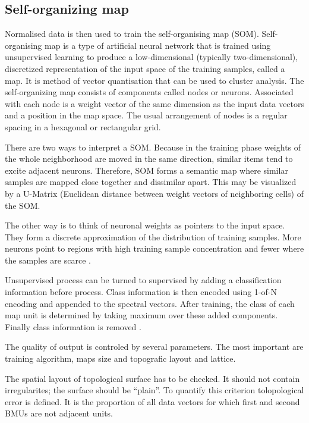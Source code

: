 \documentclass[a4paper]{IEEEtran}
\begin{document}
\subsection{Self-organizing map}
Normalised data is then used to train the self-organising map (SOM).
Self-organising map is a type of artificial neural network that is
trained using unsupervised learning to produce a low-dimensional 
(typically two-dimensional), discretized representation of the input 
space of the training samples, called a map. It is method of vector 
quantisation that can be used to 
cluster analysis.
The self-organizing map consists of components called nodes or neurons. 
Associated with each node is a weight vector of the same dimension 
as the input data vectors and a position in the map space. 
The usual arrangement of nodes is a regular spacing in a hexagonal or rectangular grid. 

There are two ways to interpret a SOM. 
Because in the training phase weights of the whole neighborhood are moved in the 
same direction, similar items tend to excite adjacent neurons. Therefore, 
SOM forms a semantic map where similar samples are mapped close together 
and dissimilar apart. This may be visualized by a U-Matrix 
(Euclidean distance between weight vectors of neighboring cells) of the SOM.

The other way is to think of neuronal weights as pointers to the input space. 
They form a discrete approximation of the distribution of training samples.
More neurons point to regions with high training sample concentration and 
fewer where the samples are scarce \cite{somwiki}.

Unsupervised process can be turned to supervised by adding a classification
information before process.
Class information is then encoded using 1-of-N encoding and appended to the 
spectral vectors. After training, the class of each map unit
is determined by taking maximum over these added components.
Finally class information is removed \cite{somtoolbox}.

The quality of output is controled by several parameters. The most important are 
training algorithm, maps size and topografic layout and lattice.

The spatial 
layout of topological surface has to be checked. 
It should not contain irregularites; the surface should be ``plain''.
To quantify this criterion tolopological error is defined. It is the proportion 
of all data vectors for which first and second BMUs are not adjacent units.
\end{document}
